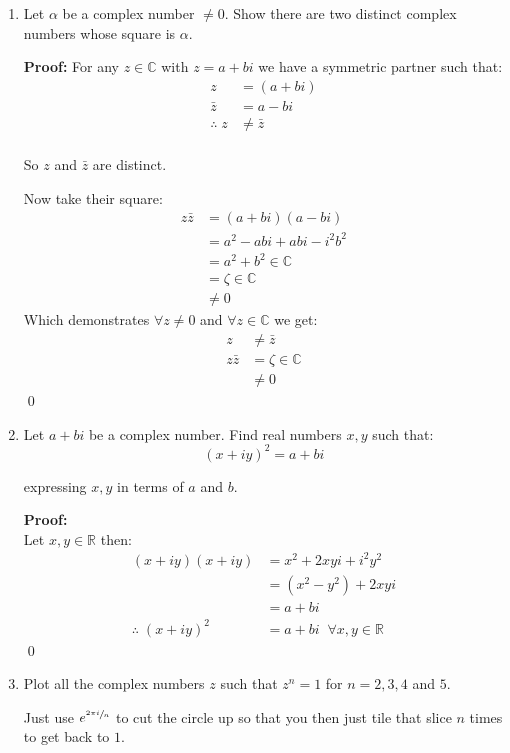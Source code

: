 \begin{enumerate}
	\item Let $\alpha$ be a complex number $\neq 0.$ Show there are two distinct complex numbers whose square is $\alpha.$
	
	\textbf{Proof:}
	For any $z \in \mathbb{C}$ with $z = a + bi$ we have a symmetric partner such that: 
	\begin{align*}
		z &= (a + bi) \\
		\bar{z} &= a - bi \\
		\therefore \; z &\neq \bar{z} \\
	\end{align*}

	So $z$ and $\bar{z}$ are distinct.

	Now take their square:
	\begin{align*}
		z \bar{z} &= (a + bi)(a - bi) \\
		&= a^2 -abi +abi -i^2 b^2 \\
		&= a^2 + b^2 \in \mathbb{C} \\
		&= \zeta \in \mathbb{C} \\
		&\neq 0
	\end{align*}
	Which demonstrates $\forall z \neq 0$ and $\forall z \in \mathbb{C}$ we get:
	\begin{align*}
		z & \neq \bar{z} \\
		z \bar{z} &= \zeta \in \mathbb{C} \\
		&\neq 0
	\end{align*}
	\qed

	\item Let $a + bi$ be a complex number. Find real numbers $x, y$ such that:
	\[(x + iy)^2 = a + bi\]

	expressing $x, y$ in terms of $a$ and $b.$
	
	\textbf{Proof:} \\
	Let $x, y \in \mathbb{R}$ then:
	\begin{align*}
		(x + iy)(x + iy) &= x^2 +2xyi + i^2 y^2 \\
		&= (x^2 - y^2) + 2xyi \\
		&= a + bi \\
		\therefore \; (x + iy)^2 &= a + bi \;\; \forall x, y \in \mathbb{R}
	\end{align*}
	\qed

	\item Plot all the complex numbers $z$ such that $z^n = 1$ for $ n = 2, 3, 4$ and $5.$

	Just use $ e^{ \sfrac{2 \pi i}{n} } $ to cut the circle up so that you then just tile that slice $n$ times to get back to $1.$


\end{enumerate}
